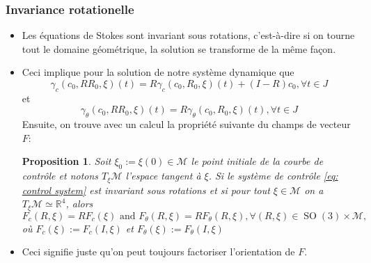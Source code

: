 \documentclass[10pt,a4paper]{article}
\theoremstyle{plain}
\theoremstyle{plain}
\theoremstyle{plain}
\theoremstyle{definition}
\theoremstyle{definition}
\theoremstyle{definition}
\theoremstyle{plain}
\newtheorem{proposition}{Proposition}[section]
\newcommand{\M}{\mathcal{M}}
\newcommand{\R}{\mathbb{R}}
\DeclareMathOperator{\SO}{SO}
\begin{document}
\subsubsection{Invariance rotationelle}
\begin{itemize}

\item Les équations de Stokes sont invariant sous rotations, c'est-à-dire si on tourne tout le domaine géométrique, la solution se transforme de la même façon.

\item Ceci implique pour la solution de notre système dynamique que
\begin{equation}
\label{eq:spatial rotational invariance}
	\gamma_c(c_0, R R_0, \xi)(t) = R \gamma_c (c_0, R_0, \xi)(t) + (I - R) c_0, \forall t \in J
\end{equation}
et
\begin{equation}
\label{eq: angular rotational invariance}
	\gamma_\theta(c_0, R R_0, \xi)(t) =  R \gamma_\theta(c_0, R_0, \xi)(t), \forall t \in J
\end{equation}
Ensuite, on trouve avec un calcul la propriété suivante du champs de vecteur $F$:
\begin{proposition}
\label{prop: rotational invariance}
Soit $\xi_0 := \xi(0) \in \M$ le point initiale de la courbe de contrôle et notons $T_{\xi}\M$ l'espace tangent à $\xi$. Si le système de contrôle \ref{eq: control system} est invariant sous rotations et si pour tout $\xi \in \M$ on a $T_{\xi}\M \simeq \R^4$, alors
\begin{equation}
	F_c(R, \xi) = R F_c(\xi) \text { and } F_\theta(R, \xi) = R F_{\theta} (R, \xi), \forall (R, \xi) \in \SO(3) \times \M,
\end{equation}
où $F_c(\xi) := F_{c}(I, \xi)$ et $F_{\theta}(\xi) := F_{\theta}(I, \xi)$
\end{proposition}

\item Ceci signifie juste qu'on peut toujours factoriser l'orientation de $F$.

\end{itemize}
\end{document}
